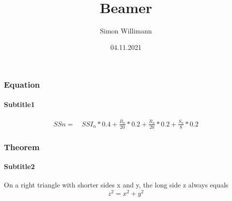 \documentclass{beamer}
\title{Beamer}
\author{Simon Willimann}
\institute{University of Zurich}
\date{04.11.2021}
\begin{document}
\frame{\titlepage}


\begin{frame}
\frametitle{Equation}
\framesubtitle{Subtitle1}
	\begin{equation*}
		\begin{aligned}
		SS{n} = & \ SSI_n*0.4 + \frac{B_n}{20}*0.2 + \frac{R_n}{20}*0.2 + \frac{S_n}{8}*0.2
		\end{aligned}
	\end{equation*} 

\end{frame}


\begin{frame}
\frametitle{Theorem}
\framesubtitle{Subtitle2}

\begin{theorem}
	\label{pythagorean}
	On a right triangle with shorter sides x and y, the long side z always equals
	\[ z^2 = x^2 + y^2 \]
\end{theorem}

\end{frame}
\end{document}
